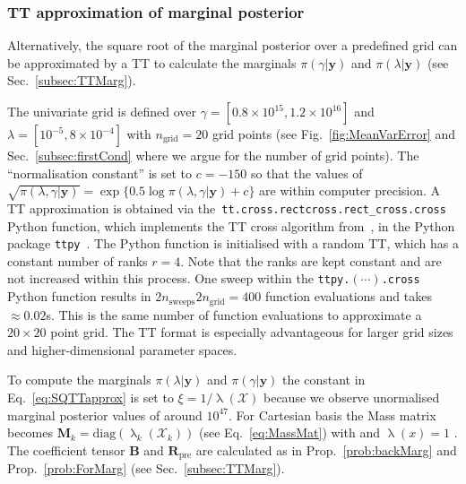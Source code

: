\subsubsection{TT approximation of marginal posterior}
\label{subsec:TTFirst}
Alternatively, the square root of the marginal posterior over a predefined grid can be approximated by a TT to calculate the marginals $\pi(\gamma|\bm{y})$ and $\pi(\lambda|\bm{y})$ (see Sec.~\ref{subsec:TTMarg}).
	
The univariate grid is defined over $\gamma = [ 0.8 \times 10^{15},1.2 \times 10^{16}]$ and $\lambda = [ 10^{-5}, 8 \times 10^{-4}]$ with $n_{\text{grid}} = 20$ grid points (see Fig.~\ref{fig:MeanVarError} and Sec.~\ref{subsec:firstCond} where we argue for the number of grid points).
The ``normalisation constant'' is set to $c=-150$ so that the values of $\sqrt{\pi(\lambda,\gamma| \bm{y})}=\exp\{0.5\log\pi(\lambda,\gamma|\bm{y})+c\}$ are within computer precision.
A TT approximation is obtained via the~\texttt{tt.cross.rectcross.rect\_cross.cross} Python function, which implements the TT cross algorithm from~\cite{OSELEDETS2010TTCross,Dolgov2018TTCross}, in the Python package \texttt{ttpy}~\cite{Oseledets2018ttpy}. The Python function is initialised with a random TT, which has a constant number of ranks $r = 4$.
Note that the ranks are kept constant and are not increased within this process.
One sweep within the \texttt{ttpy.$(\cdots)$.cross} Python function results in $2n_{\text{sweeps}}2n_{\text{grid}} =400$ function evaluations and takes $\approx 0.02$s.
This is the same number of function evaluations to approximate a $20 \times 20$ point grid.
The TT format is especially advantageous for larger grid sizes and higher-dimensional parameter spaces.



To compute the marginals $\pi(\lambda| \bm{y})$ and $\pi(\gamma| \bm{y})$ the constant in Eq.~\ref{eq:SQTTapprox} is set to $\xi = 1 / \uplambda (\mathcal{X})$ because we observe unormalised marginal posterior values of around $10^{47}$.
For Cartesian basis the Mass matrix becomes $\bm{M}_k = \text{diag}(\uplambda_k(\mathcal{X}_k))$ (see Eq.~\ref{eq:MassMat}) with and $\uplambda(x) = 1$ .
The coefficient tensor $\bm{B}$ and $\bm{R}_{\text{pre}}$ are calculated as in Prop.~\ref{prob:backMarg} and Prop.~\ref{prob:ForMarg} (see Sec.~\ref{subsec:TTMarg}).

